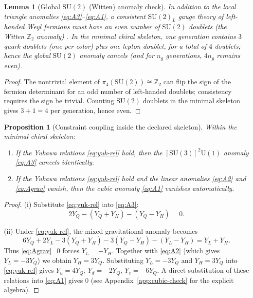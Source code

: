 \documentclass[11pt]{article}
\newtheorem{lemma}[definition]{Lemma}
\newtheorem{proposition}[definition]{Proposition}
\theoremstyle{remark}
\newcommand{\SU}{\ensuremath{\mathrm{SU}}}
\newcommand{\U}{\ensuremath{\mathrm{U}}}
\begin{document}
\begin{lemma}[Global $\SU(2)$ (Witten) anomaly check]\label{lem:witten}
In addition to the local triangle anomalies \eqref{eq:A3}--\eqref{eq:A1}, a consistent $\SU(2)_L$ gauge theory of
left-handed Weyl fermions must have an even number of $\SU(2)$ doublets (the Witten $\mathbb{Z}_2$ anomaly)
\cite{Witten1982}. In the minimal chiral skeleton, one generation contains $3$ quark doublets (one per color) plus
one lepton doublet, for a total of $4$ doublets; hence the global $\SU(2)$ anomaly cancels (and for $n_g$ generations,
$4n_g$ remains even).
\end{lemma}

\begin{proof}
The nontrivial element of $\pi_4(\SU(2))\cong\mathbb{Z}_2$ can flip the sign of the fermion determinant for an odd
number of left-handed doublets; consistency requires the sign be trivial. Counting $\SU(2)$ doublets in the minimal
skeleton gives $3+1=4$ per generation, hence even.
\end{proof}



\begin{proposition}[Constraint coupling inside the declared skeleton]\label{prop:constraint-coupling}
Within the minimal chiral skeleton:
\begin{enumerate}[label=(\roman*),leftmargin=2.2em]
\item If the Yukawa relations \eqref{eq:yuk-rel} hold, then the $[\SU(3)]^2\U(1)$ anomaly
\eqref{eq:A3} cancels identically.
\item If the Yukawa relations \eqref{eq:yuk-rel} hold and the linear anomalies \eqref{eq:A2} and
\eqref{eq:Agrav} vanish, then the cubic anomaly \eqref{eq:A1} vanishes automatically.
\end{enumerate}
\end{proposition}

\begin{proof}
(i) Substitute \eqref{eq:yuk-rel} into \eqref{eq:A3}:
\[
2Y_Q-(Y_Q+Y_H)-(Y_Q-Y_H)=0.
\]

(ii) Under \eqref{eq:yuk-rel}, the mixed gravitational anomaly becomes
\[
6Y_Q+2Y_L-3(Y_Q+Y_H)-3(Y_Q-Y_H)-(Y_L-Y_H)=Y_L+Y_H.
\]
Thus \eqref{eq:Agrav}=0 forces $Y_L=-Y_H$.
Together with \eqref{eq:A2} (which gives $Y_L=-3Y_Q$) we obtain $Y_H=3Y_Q$.
Substituting $Y_L=-3Y_Q$ and $Y_H=3Y_Q$ into \eqref{eq:yuk-rel} gives
$Y_u=4Y_Q$, $Y_d=-2Y_Q$, $Y_e=-6Y_Q$.
A direct substitution of these relations into \eqref{eq:A1} gives $0$ (see
Appendix~\ref{app:cubic-check} for the explicit algebra).
\end{proof}
\end{document}

